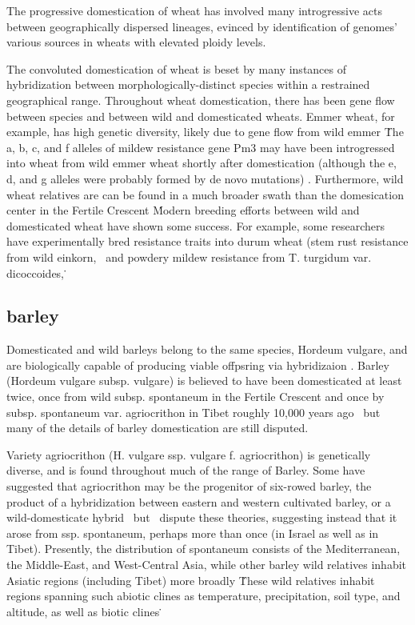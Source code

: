 \documentclass[11pt]{article}
\begin{document}
The progressive domestication of wheat has involved many introgressive acts between geographically dispersed lineages, evinced by identification of genomes' various sources in wheats with elevated ploidy levels.

The convoluted domestication of wheat is beset by many instances of hybridization between morphologically-distinct species within a restrained geographical range.
Throughout wheat domestication, there has been gene flow between species and between wild and domesticated wheats.
Emmer wheat, for example, has high genetic diversity, likely due to gene flow from wild emmer \cite{luo2007structure, dvorak2006molecular}\.
The a, b, c, and f alleles of mildew resistance gene Pm3 may have been introgressed into wheat from wild emmer wheat shortly after domestication (although the e, d, and g alleles were probably formed by de novo mutations) \cite{TPJ:TPJ2772}.
Furthermore, wild wheat relatives are can be found in a much broader swath than the domesication center in the Fertile Crescent \cite{CWR}\.
Modern breeding efforts between wild and domesticated wheat have shown some success.
For example, some researchers have experimentally bred resistance traits into durum wheat (stem rust resistance from wild einkorn, \cite{gerechter1971transfer}\, and powdery mildew resistance from T. turgidum var. dicoccoides, \cite{blanco2008molecular}\.

\subsection*{barley}

Domesticated and wild barleys belong to the same species, Hordeum vulgare, and are biologically capable of producing viable offpsring via hybridizaion \cite{von1995ecographical}.
Barley (Hordeum vulgare subsp. vulgare) is believed to have been domesticated at least twice, once from wild subsp. spontaneum in the Fertile Crescent and once by subsp. spontaneum var. agriocrithon in Tibet roughly 10,000 years ago \cite{takahashi1955origin, badr2000origin, oka2012origin, azhaguvel2007phylogenetic, haberer2015barley}\, but many of the details of barley domestication are still disputed.

Variety agriocrithon (H. vulgare ssp. vulgare f. agriocrithon) is genetically diverse, and is found throughout much of the range of Barley.
Some have suggested that agriocrithon may be the progenitor of six-rowed barley, the product of a hybridization between eastern and western cultivated barley, or a wild-domesticate hybrid \cite{staudt1961origin, zohary1959hordeum, murphy1982origin}\, but \cite{azhaguvel2007phylogenetic}\ dispute these theories, suggesting instead that it arose from ssp. spontaneum, perhaps more than once (in Israel as well as in Tibet).
Presently, the distribution of spontaneum consists of the Mediterranean, the Middle-East, and West-Central Asia, while other barley wild relatives inhabit Asiatic regions (including Tibet) more broadly \cite{nevo2010drought, harlan1995living, CWR}\.
These wild relatives inhabit regions spanning such abiotic clines as temperature, precipitation, soil type, and altitude, as well as biotic clines \cite{nevo2010drought}\.
\end{document}

